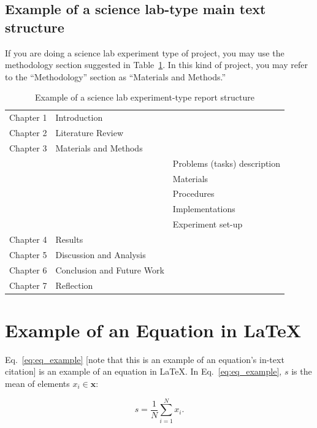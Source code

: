 \subsection{Example of a science lab-type main text structure}
If you are doing a science lab experiment type of project, you may use the  methodology section suggested in Table~\ref{tab:lab_temp}. In this kind of project, you may refer to the ``Methodology'' section as ``Materials and Methods.''
\begin{table}[ht!]
    \centering
    \caption{Example of a science lab experiment-type report structure}
    \label{tab:lab_temp}
    \begin{tabular}{lll}     
        \toprule                   
        Chapter 1 & Introduction  &    \\        
        Chapter 2 & Literature Review  &    \\                
        Chapter 3 & Materials and Methods   &    \\
        &               & Problems (tasks) description  \\
        &               & Materials \\        
        &               & Procedures  \\                
        &               & Implementations   \\
        &               & Experiment set-up   \\
        Chapter 4 & Results       &  \\
        Chapter 5 & Discussion and Analysis  &    \\
        Chapter 6 & Conclusion and Future Work  &    \\        
        Chapter 7 & Reflection  &    \\          
        \bottomrule
    \end{tabular}
\end{table}

\section{Example of an Equation in \LaTeX}
Eq.~\ref{eq:eq_example} [note that this is an example of an equation's in-text citation] is an example of an equation in \LaTeX. In Eq.~\eqref{eq:eq_example}, $ s $ is the mean of elements $ x_i \in \mathbf{x} $: 

\begin{equation}
\label{eq:eq_example} %
s = \frac{1}{N} \sum_{i = 1}^{N} x_i. 
\end{equation}

